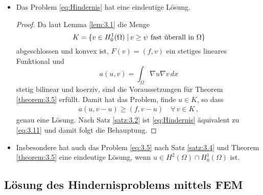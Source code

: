 \begin{itemize}
\begin{proof}
Insgesamt gibt es also für das Problem \eqref{eq:3.7} genau eine  Lösung.
\end{proof}

\item \begin{kor}
Das Problem \eqref{eq:Hindernis} hat eine eindeutige Lösung.
\end{kor}

\begin{proof}
Da laut Lemma \ref{lem:3.1} die Menge 
\[
	K=\{v \in H^1_0(\Omega) \;\vert\, v \ge \psi \text{ fast überall in }\Omega\}
\]
abgeschlossen und konvex ist, $F(v) = (f,v)$ ein stetiges lineares Funktional und 
\[
	a(u,v) = \int_\Omega \nabla u \nabla v \, dx
\]
stetig bilinear und koerziv, sind die Voraussetzungen für Theorem \ref{theorem:3.5} erfüllt. Damit hat das Problem, finde $u \in K$, so dass
\begin{align}\label{eq:3.11}
	a(u,v-u) \ge (f,v-u) \quad \forall \, v \in K \, ,
\end{align}
genau eine Lösung. Nach Satz \ref{satz:3.2} ist \eqref{eq:Hindernis} äquivalent zu \eqref{eq:3.11} und damit folgt die Behauptung.
\end{proof}

\item \begin{bem}
Insbesondere hat auch das Problem \eqref{eq:3.5} nach Satz \ref{satz:3.4} und Theorem \ref{theorem:3.5} eine eindeutige Lösung, wenn $u \in H^2(\Omega) \cap H^1_0(\Omega)$ ist.
\end{bem}
\end{itemize}







\subsection{Lösung des Hindernisproblems mittels FEM}

